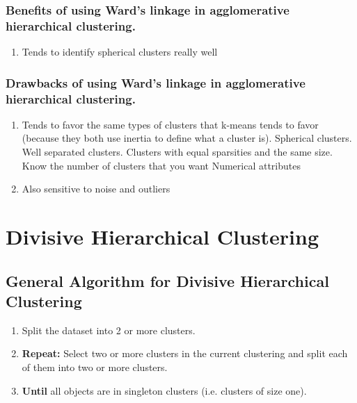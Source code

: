 \documentclass[11pt]{elegantbook}
\begin{document}
\subsubsection*{Benefits of using Ward's linkage in agglomerative hierarchical clustering.}
\begin{enumerate}[1.]
    \item Tends to identify spherical clusters really well
\end{enumerate}
\subsubsection*{Drawbacks of using Ward's linkage in agglomerative hierarchical clustering.}
\begin{enumerate}[1.]
    \item Tends to favor the same types of clusters that k-means tends to favor (because they both use inertia to define what a cluster is).
    \subitem Spherical clusters.
    \subitem Well separated clusters.
    \subitem Clusters with equal sparsities and the same size.
    \subitem Know the number of clusters that you want
    \subitem Numerical attributes
    \item Also sensitive to noise and outliers
\end{enumerate}







\section{Divisive Hierarchical Clustering}
\subsection{General Algorithm for Divisive Hierarchical Clustering}
\begin{enumerate}[1.]
    \item Split the dataset into 2 or more clusters.
    \item \textbf{Repeat:}
    Select two or more clusters in the current clustering and split each of them into two or more clusters.
    \item \textbf{Until} all objects are in singleton clusters (i.e. clusters of size one).
\end{enumerate}
\end{document}
